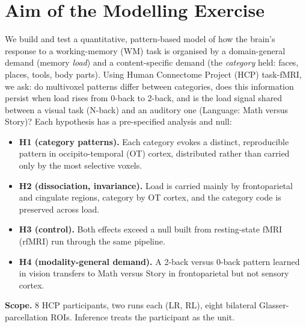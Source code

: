 \documentclass[conference]{IEEEtran}
\newcommand{\Nsub}{8}
\begin{document}
\section{Aim of the Modelling Exercise}
We build and test a quantitative, pattern-based model of how the brain's response to a working-memory (WM) task is organised by a domain-general demand (memory \emph{load}) and a content-specific demand (the \emph{category} held: faces, places, tools, body parts). Using Human Connectome Project (HCP) task-fMRI, we ask: do multivoxel patterns differ between categories, does this information persist when load rises from 0-back to 2-back, and is the load signal shared between a visual task (N-back) and an auditory one (Language: Math versus Story)? Each hypothesis has a pre-specified analysis and null:
\begin{itemize}
\item \textbf{H1 (category patterns).} Each category evokes a distinct, reproducible pattern in occipito-temporal (OT) cortex, distributed rather than carried only by the most selective voxels.
\item \textbf{H2 (dissociation, invariance).} Load is carried mainly by frontoparietal and cingulate regions, category by OT cortex, and the category code is preserved across load.
\item \textbf{H3 (control).} Both effects exceed a null built from resting-state fMRI (rfMRI) run through the same pipeline.
\item \textbf{H4 (modality-general demand).} A 2-back versus 0-back pattern learned in vision transfers to Math versus Story in frontoparietal but not sensory cortex.
\end{itemize}
\textbf{Scope.} \Nsub{} HCP participants, two runs each (LR, RL), eight bilateral Glasser-parcellation ROIs. Inference treats the participant as the unit.
\end{document}

